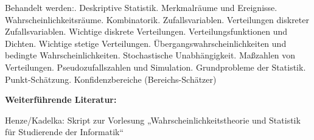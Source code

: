 \begin{course}
\begin{content}
 

Behandelt werden:. Deskriptive Statistik. Merkmalräume und Ereignisse. Wahrscheinlichkeitsräume. Kombinatorik. Zufallsvariablen. Verteilungen diskreter Zufallsvariablen. Wichtige diskrete Verteilungen. Verteilungsfunktionen und Dichten. Wichtige stetige Verteilungen. Übergangswahrscheinlichkeiten und bedingte Wahrscheinlichkeiten. Stochastische Unabhängigkeit. Maßzahlen von Verteilungen. Pseudozufallszahlen und Simulation. Grundprobleme der Statistik. Punkt-Schätzung. Konfidenzbereiche (Bereichs-Schätzer)


\end{content}



\begin{literature}\textbf{Weiterführende Literatur:}

Henze/Kadelka: Skript zur Vorlesung „Wahrscheinlichkeitstheorie und Statistik für Studierende der Informatik“

\end{literature}



\end{course}